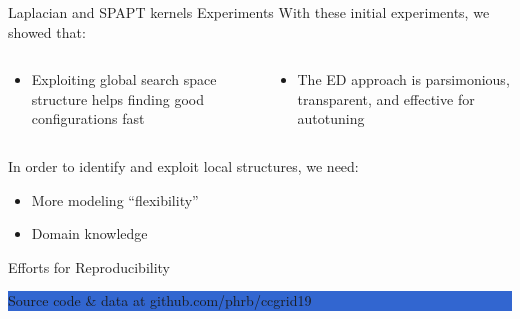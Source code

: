 \documentclass[10pt, compress, aspectratio=169, xcolor={table,usenames,dvipsnames}]{beamer}
\begin{document}
\begin{frame}[label={sec:orge5639b7}]{Laplacian and SPAPT kernels Experiments}
With these initial experiments, we showed that:

\begin{columns}
\begin{column}{0.5\columnwidth}
\begin{itemize}
\item Exploiting \alert{global search space structure} helps finding good configurations
fast
\end{itemize}
\end{column}
\begin{column}{0.5\columnwidth}
\begin{itemize}
\item The ED approach is parsimonious, transparent, and \alert{effective} for autotuning
\end{itemize}
\end{column}
\end{columns}
\vspace{0.5cm}
In order  to identify  and exploit \alert{local  structures}, we  need:

\begin{itemize}
\item More \alert{modeling ``flexibility''}
\item \alert{Domain knowledge}
\end{itemize}

\begin{block}{Efforts for Reproducibility}
\begin{center}
\colorbox{Highlight}{\parbox[c]{0.54\textwidth}{\centering \alert{Source code} \& \alert{data} at github.com/phrb/ccgrid19}}
\end{center}
\end{block}
\end{frame}
\end{document}
